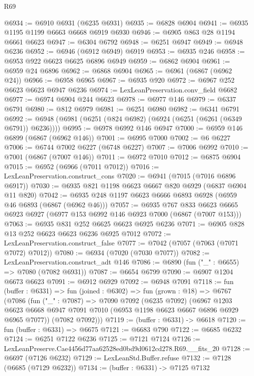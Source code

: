 \begin{lexlean}{R69}
\begin{coremodule}
{@6934 := @6910 @6931 (@6235 @6931)
@6935 := @6828 @6904
@6941 := @6935 @1195 @1199 @6663 @6668 @6919 @6930
@6946 := @6905 @863 @28 @1194 @6661 @6623
@6947 := @6304 @6792
@6948 := @6251 @6947
@6949 := @6948 @6236
@6952 := @6946 (@6912 @6949) @6919
@6953 := @6935 @246
@6958 := @6953 @922 @6623 @6625 @6896 @6949
@6959 := @6862 @6904
@6961 := @6959 @24 @6896
@6962 := @6868 @6904
@6965 := @6961 (@6867 (@6962 @24))
@6966 := @6958 @6965
@6967 := @6935 @920
@6972 := @6967 @252 @6623 @6623 @6947 @6236
@6974 := LexLeanPreservation.conv_field @6682
@6977 := @6974 @6904 @244 @6623
@6978 := @6977 @146
@6979 := @6337 @6791
@6980 := @812 @6979
@6981 := @6251 @6980
@6982 := @6341 @6791
@6992 := @6948 (@6981 (@6251 (@824 @6982) (@6924 (@6251 (@6261 (@6349 @6791)) @6236))))
@6995 := @6978 @6992 @146 @6947
@7000 := @6959 @146 @6899 (@6867 (@6962 @146))
@7001 := @6995 @7000
@7002 := @6 @6227
@7006 := @6744 @7002 @6227 (@6748 @6227)
@7007 := @7006 @6992
@7010 := @7001 (@6867 (@7007 @146))
@7011 := @6972 @7010
@7012 := @6875 @6904
@7015 := @6952 (@6966 (@7011 @7012))
@7016 := LexLeanPreservation.construct_cons
@7020 := @6941 (@7015 (@7016 @6896 @6917))
@7030 := @6935 @821 @1198 @6623 @6667 @820 @6929 (@6837 @6904 @11 @820)
@7042 := @6935 @248 @1197 @6623 @6666 @6893 @6928 (@6959 @46 @6893 (@6867 (@6962 @46)))
@7057 := @6935
    @767
    @833
    @6623
    @6665
    @6923
    @6927
    (@6977 @153 @6992 @146 @6923 @7000 (@6867 (@7007 @153)))
@7063 := @6935 @831 @252 @6625 @6623 @6925 @6236
@7071 := @6905 @828 @13 @252 @6623 @6623 @6236 @6925 @7012
@7072 := LexLeanPreservation.construct_false
@7077 := @7042 (@7057 (@7063 (@7071 @7072) @7012))
@7080 := @6934 (@7020 (@7030 @7077))
@7082 := LexLeanPreservation.construct_adt @146
@7086 := @6890 (fun ("_" : @6655) => @7080 (@7082 @6931))
@7087 := @6654 @6799
@7090 := @6907 @1204 @6673 @6623
@7091 := @6912 @6929
@7092 := @6948 @7091
@7118 := fun (buffer : @6331) =>
  fun (joined : @6302) =>
  fun (grown : @18) =>
  @6767
    (@7086
      (fun ("_" : @7087) =>
      @7090
        @7092
        (@6235 @7092)
        (@6967
          @1203
          @6623
          @6668
          @6947
          @7091
          @7010
          (@6953 @1198 @6623 @6667 @6896 @6929 @6965 @7077))
        (@7082 @7092)))
@7119 := (buffer : @6331) -> @6618
@7120 := fun (buffer : @6331) => @6675
@7121 := @6683 @790
@7122 := @6685 @6232
@7124 := @6251 @7122 @6236
@7125 := @7121 @7124
@7126 := LexLeanPreserve.Cae4456d77aa62528ed0bd9d0612cd278.R69.__fits_20
@7128 := @6697 (@7126 @6232)
@7129 := LexLeanStd.Buffer.refuse
@7132 := @7128 (@6685 (@7129 @6232))
@7134 := (buffer : @6331) -> @7125 @7132
}
\end{coremodule}
\end{lexlean}

